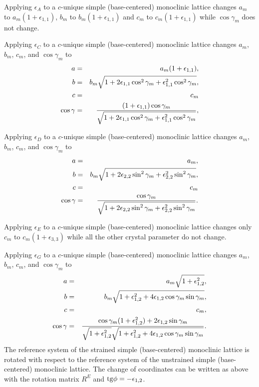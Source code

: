 \documentclass[12pt,a4paper]{article}
\begin{document}
Applying $\epsilon_A$ to a $c$-unique simple (base-centered) monoclinic 
lattice changes
$a_m$ to $a_m(1+\epsilon_{1,1})$, $b_m$ to $b_m(1+\epsilon_{1,1})$
and $c_m$ to $c_m(1+\epsilon_{1,1})$ while $\cos \gamma_m$
does not change.

Applying $\epsilon_C$ to a $c$-unique simple (base-centered) monoclinic lattice 
changes $a_m$, $b_m$, $c_m$, and $\cos \gamma_m$ to 
\begin{eqnarray}
a&=&a_m(1+\epsilon_{1,1}), \\
b&=&b_m \sqrt{1+2 \epsilon_{1,1}\cos^2\gamma_m
+\epsilon_{1,1}^2 \cos^2\gamma_m}, \\
c&=&c_m \\
\cos\gamma &=& {(1+\epsilon_{1,1}) \cos\gamma_m \over 
\sqrt{1+2 \epsilon_{1,1}\cos^2\gamma_m
+\epsilon_{1,1}^2 \cos^2\gamma_m}},
\end{eqnarray}

Applying $\epsilon_D$ to a $c$-unique simple (base-centered) monoclinic lattice 
changes $a_m$, $b_m$, $c_m$, and $\cos \gamma_m$ to 
\begin{eqnarray}
a&=&a_m, \\
b&=&b_m \sqrt{1+2 \epsilon_{2,2}\sin^2\gamma_m
+\epsilon_{2,2}^2 \sin^2\gamma_m}, \\
c&=&c_m \\
\cos\gamma &=& {\cos\gamma_m \over 
\sqrt{1+2 \epsilon_{2,2}\sin^2\gamma_m
+\epsilon_{2,2}^2 \sin^2\gamma_m}}.
\end{eqnarray}

Applying $\epsilon_E$ to a $c$-unique simple (base-centered) monoclinic 
lattice changes
only $c_m$ to $c_m(1+\epsilon_{3,3})$ while all the other crystal
parameter do not change.

Applying $\epsilon_G$ to a $c$-unique simple (base-centered) monoclinic lattice 
changes $a_m$, $b_m$, $c_m$, and $\cos \gamma_m$ to 
\begin{eqnarray}
a&=&a_m \sqrt{1+\epsilon_{1,2}^2}, \\
b&=&b_m \sqrt{1+\epsilon_{1,2}^2
+4\epsilon_{1,2} \cos\gamma_m \sin\gamma_m}, \\
c&=&c_m, \\
\cos\gamma &=& {\cos\gamma_m (1+\epsilon_{1,2}^2) + 2 \epsilon_{1,2} 
\sin \gamma_m \over \sqrt{1+\epsilon_{1,2}^2}
\sqrt{1+\epsilon_{1,2}^2+4\epsilon_{1,2} \cos\gamma_m \sin\gamma_m}}.
\end{eqnarray}
The reference system of the strained simple (base-centered) monoclinic 
lattice is rotated 
with respect to the reference system of the unstrained simple 
(base-centered) monoclinic lattice. 
The change of coordinates can be written as above with the rotation matrix 
$R^E$ and ${\rm tg}\phi=-\epsilon_{1,2}$.
\end{document}
